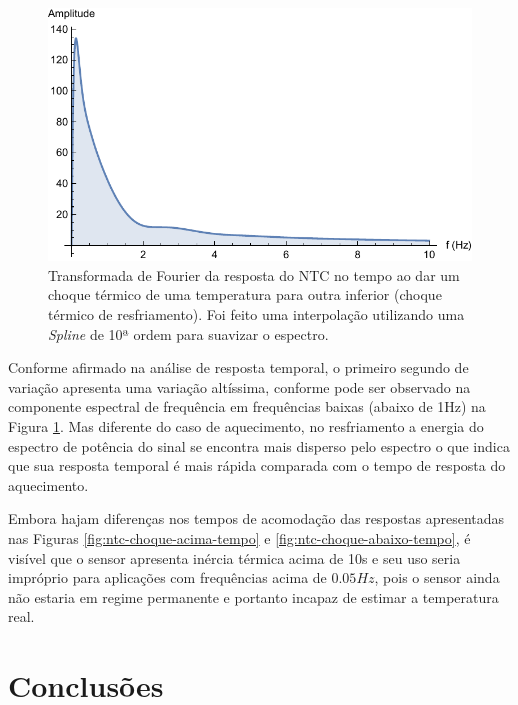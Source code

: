 \documentclass[a4paper]{instrumentacao}
\begin{document}
\begin{figure}[H]
\center
\includegraphics[width=\textwidth]{ThermalShock-Down-Frequency.pdf}
\caption{Transformada de Fourier da resposta do NTC no tempo ao dar um choque térmico de uma temperatura para outra inferior (choque térmico de resfriamento). Foi feito uma interpolação utilizando uma \textit{Spline} de 10ª ordem para suavizar o espectro.}
\label{fig:ntc-choque-abaixo-frequencia}
\end{figure}

Conforme afirmado na análise de resposta temporal, o primeiro segundo de variação apresenta uma variação altíssima, conforme pode ser observado na componente espectral de frequência em frequências baixas (abaixo de 1Hz) na Figura \ref{fig:ntc-choque-abaixo-frequencia}. Mas diferente do caso de aquecimento, no resfriamento a energia do espectro de potência do sinal se encontra mais disperso pelo espectro o que indica que sua resposta temporal é mais rápida comparada com o tempo de resposta do aquecimento.

Embora hajam diferenças nos tempos de acomodação das respostas apresentadas nas Figuras \ref{fig:ntc-choque-acima-tempo} e \ref{fig:ntc-choque-abaixo-tempo}, é visível que o sensor apresenta inércia térmica acima de 10s e seu uso seria impróprio para aplicações com frequências acima de $0.05Hz$, pois o sensor ainda não estaria em regime permanente e portanto incapaz de estimar a temperatura real.

\chapter{Conclusões}

\end{document}
